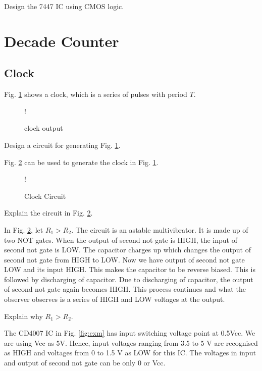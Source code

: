 \documentclass[journal,12pt,twocolumn]{IEEEtran}
\begin{document}
\begin{problem}
Design the 7447 IC using CMOS logic.
\end{problem}
\section{Decade Counter}
%
\subsection{Clock}
Fig. \ref{fig:clock} shows a clock, which is a series of pulses with period $T$.
%
\begin{figure}[!h]
\centering
\resizebox {\columnwidth} {!} {

}
\caption{clock output}
\label{fig:clock}
\end{figure}
\begin{problem}
Design a circuit for generating Fig. \ref{fig:clock}.
\end{problem}
\solution Fig. \ref{fig:clock_circuit} can be used to generate the clock in Fig. \ref{fig:clock}.
\begin{figure}[!h]
\centering
\resizebox {\columnwidth} {!} {

}
\caption{Clock Circuit}
\label{fig:clock_circuit}
\end{figure}
%
\begin{problem}
Explain the circuit in Fig. \ref{fig:clock_circuit}.
\end{problem}
\solution In Fig. \ref{fig:clock_circuit},  let ${R_1}>{R_2}$.
The circuit is an astable multivibrator. It is made up of two NOT gates. When the output of second not gate is HIGH, the input of second not gate is LOW. The capacitor charges up which changes the output of second not gate from HIGH to LOW. Now we have output of second not gate LOW and its input HIGH. This makes the capacitor to be reverse biased. This is followed by discharging of capacitor. Due to discharging of capacitor, the output of second not gate again becomes HIGH. This process continues and what the observer observes is a series of HIGH and LOW voltages at the output. 
\begin{problem}
Explain why $R_1 > R_2$.
\end{problem}
\solution The CD4007 IC in Fig. \ref{fig:exm} has input switching voltage point at 0.5Vcc. We are using Vcc as 5V. Hence, input voltages ranging from 3.5 to 5 V are recognised as HIGH and voltages from 0 to 1.5 V as LOW for this IC. The voltages in input and output of second not gate can be only 0 or Vcc. 
\end{document}
